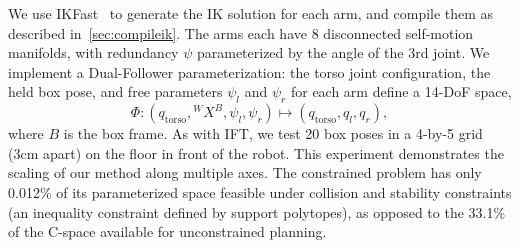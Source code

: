 \documentclass[letterpaper, 10 pt, conference]{ieeeconf}
\begin{document}
We use IKFast~\cite{ikfast} to generate the IK solution for each arm, and compile them as described in~\cref{sec:compileik}.
The arms each have 8 disconnected self-motion manifolds, with redundancy $\psi$ parameterized by the angle of the $3$rd joint.
We implement a Dual-Follower parameterization: the torso joint configuration, the held box pose, and free parameters $\psi_l$ and $\psi_r$ for each arm define a 14-DoF space,
\[
    \Phi : (q_\text{torso}, {}^{W}X^{B}, \psi_l, \psi_r) \mapsto (q_\text{torso}, q_l, q_r),
\]
where $B$ is the box frame.
As with IFT, we test 20 box poses in a 4-by-5 grid (3cm apart) on the floor in front of the robot. This experiment demonstrates the scaling of our method along multiple axes. The constrained problem has only 0.012\% of its parameterized space feasible under collision and stability constraints (an inequality constraint defined by support polytopes), as opposed to the 33.1\% of the C-space available for unconstrained planning. 


\end{document}
